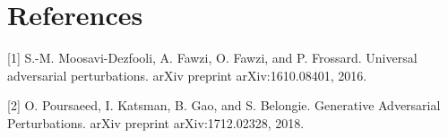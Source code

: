 \documentclass{article}
\begin{document}
\section*{References}
\small

[1] S.-M. Moosavi-Dezfooli, A. Fawzi, O. Fawzi, and
P. Frossard. Universal adversarial perturbations. arXiv
preprint arXiv:1610.08401, 2016.

[2] O. Poursaeed, I. Katsman, B. Gao, and S. Belongie. Generative Adversarial Perturbations. arXiv
preprint arXiv:1712.02328, 2018.
\end{document}
